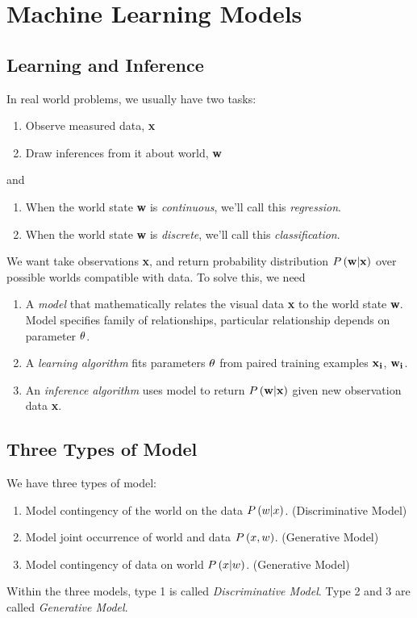 \section{Machine Learning Models}

\subsection{Learning and Inference}

In real world problems, we usually have two tasks:
	\begin{enumerate}
		\item Observe measured data, \textbf{x}
		\item Draw inferences from it about world, \textbf{w}
	\end{enumerate}
and
	\begin{enumerate}
		\item When the world state \textbf{w} is \textit{continuous}, we'll call this \textit{regression}.
		\item When the world state \textbf{w} is \textit{discrete}, we'll call this \textit{classification}.
	\end{enumerate}
We want take observations \textbf{x}, and return probability distribution $\P{\bf w|x}$ over possible worlds compatible with data. To solve this, we need
	\begin{enumerate}
		\item A \textit{model} that mathematically relates the visual data \textbf{x} to the world state \textbf{w}. Model specifies family of relationships, particular relationship depends on parameter ${\bf \th}$.
		\item A \textit{learning algorithm} fits parameters ${\bf \th}$ from paired training examples ${\bf x_i}$, ${\bf w_i}$.
		\item An \textit{inference algorithm} uses model to return $\P{\bf w|x}$ given new observation data \textbf{x}.
	\end{enumerate}

\subsection{Three Types of Model}

We have three types of model:
	\begin{enumerate}
		\item Model contingency of the world on the data $\P{w|x}$. (Discriminative Model)
		\item Model joint occurrence of world and data $\P{x,w}$. (Generative Model)
		\item Model contingency of data on world $\P{x|w}$. (Generative Model)
	\end{enumerate}
Within the three models, type 1 is called \textit{Discriminative Model}. Type 2 and 3 are called \textit{Generative Model}.

